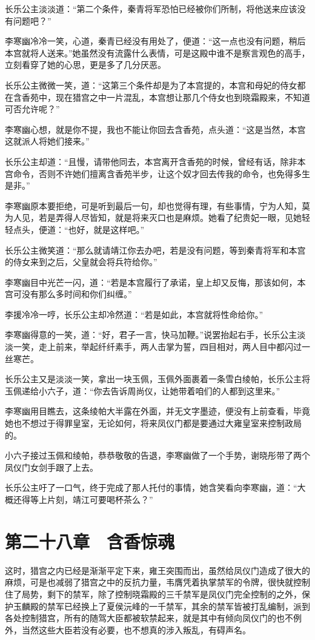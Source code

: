 长乐公主淡淡道：“第二个条件，秦青将军恐怕已经被你们所制，将他送来应该没有问题吧？”

李寒幽冷冷一笑，心道，秦青已经没有用处了，便道：“这一点也没有问题，稍后本宫就将人送来。”她虽然没有流露什么表情，可是这殿中谁不是察言观色的高手，立刻看穿了她的心思，更是多了几分厌恶。

长乐公主微微一笑，道：“这第三个条件却是为了本宫提的，本宫和母妃的侍女都在含香苑中，现在猎宫之中一片混乱，本宫想让那几个侍女也到晓霜殿来，不知道可否允许呢？”

李寒幽心想，就是你不提，我也不能让你回去含香苑，点头道：“这是当然，本宫这就派人将她们接来。”

长乐公主却道：“且慢，请带他同去，本宫离开含香苑的时候，曾经有话，除非本宫命令，否则不许她们擅离含香苑半步，让这个奴才回去传我的命令，也免得多生是非。”

李寒幽原本要拒绝，可是听到最后一句，却也觉得有理，有些事情，宁为人知，莫为人见，若是弄得人尽皆知，就是将来灭口也是麻烦。她看了纪贵妃一眼，见她轻轻点头，便道：“也好，就是这样吧。”

长乐公主微笑道：“那么就请靖江你去办吧，若是没有问题，等到秦青将军和本宫的侍女来到之后，父皇就会将兵符给你。”

李寒幽目中光芒一闪，道：“若是本宫履行了承诺，皇上却又反悔，那该如何，本宫可没有那么多时间和你们纠缠。”

李援冷冷一哼，长乐公主却冷然道：“若是如此，本宫就将性命给你。”

李寒幽得意的一笑，道：“好，君子一言，快马加鞭。”说罢抬起右手，长乐公主淡淡一笑，走上前来，举起纤纤素手，两人击掌为誓，四目相对，两人目中都闪过一丝寒芒。

长乐公主又是淡淡一笑，拿出一块玉佩，玉佩外面裹着一条雪白绫帕，长乐公主将玉佩递给小六子，道：“你去告诉周尚仪，让她带着咱们的人都到这里来。”

李寒幽用目瞧去，这条绫帕大半露在外面，并无文字墨迹，便没有上前查看，毕竟她也不想过于得罪皇室，无论如何，将来凤仪门都是要通过大雍皇室来控制政局的。

小六子接过玉佩和绫帕，恭恭敬敬的告退，李寒幽做了一个手势，谢晓彤带了两个凤仪门女剑手跟了上去。

长乐公主吁了一口气，终于完成了那人托付的事情，她含笑看向李寒幽，道：“大概还得等上片刻，靖江可要喝杯茶么？”

\chapter{第二十八章　含香惊魂}

这时，猎宫之内已经是渐渐平定下来，雍王突围而出，虽然给凤仪门造成了很大的麻烦，可是也减弱了猎宫之中的反抗力量，韦膺凭着执掌禁军的令牌，很快就控制住了局势，剩下的禁军，除了控制晓霜殿的三千禁军是凤仪门完全控制的之外，保护玉麟殿的禁军已经换上了夏侯沅峰的一千禁军，其余的禁军皆被打乱编制，派到各处控制猎宫，所有的随驾大臣都被软禁起来，就是其中有倾向凤仪门的也不例外，当然这些大臣若没有必要，也不想真的涉入叛乱，有碍声名。

